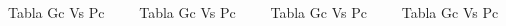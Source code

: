 \documentclass[final, xcolor=table]{beamer}\usepackage[]{graphicx}\usepackage[]{color}
\begin{document}
\begin{frame}
\begin{columns}[t]
\begin{column}{.24 \linewidth}
\begin{block}{\small Tabla Gc Vs Pc }

\end{block}
\end{column}


\begin{column}{.24 \linewidth}
\begin{block}{\small Tabla Gc Vs Pc }


\end{block}
\end{column}


\begin{column}{.24 \linewidth}
\begin{block}{\small Tabla Gc Vs Pc }


\end{block}
\end{column}


\begin{column}{.24 \linewidth}
\begin{block}{\small Tabla Gc Vs Pc }


\end{block}
\end{column}

\end{columns}
\end{frame}
\end{document}
